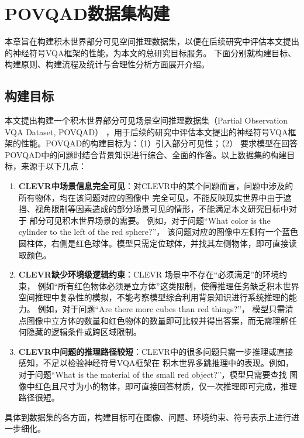 \chapter{POVQAD数据集构建}
\label{dataset}
本章旨在构建积木世界部分可见空间推理数据集，以便在后续研究中评估本文提出的神经符号VQA框架的性能，为本文的总研究目标服务。
下面分别就构建目标、构建原则、构建流程及统计与合理性分析方面展开介绍。
\section{构建目标}
本文提出构建一个积木世界部分可见场景空间推理数据集（Partial Observation VQA Data\-set, POVQAD）
，用于后续的研究中评估本文提出的神经符号VQA框架的性能。POVQAD的构建目标为：（1）引入部分可见性；（2）
要求模型在回答POVQAD中的问题时结合背景知识进行综合、全面的作答。以上数据集的构建目标，来源于以下几点：
\begin{enumerate}[nosep]
\item \textbf{CLEVR中场景信息完全可见}：对CLEVR中的某个问题而言，问题中涉及的所有物体，均在该问题对应的图像中
完全可见，不能反映现实世界中由于遮挡、视角限制等因素造成的部分场景可见的情形，不能满足本文研究目标中对于
部分可见积木世界场景的需要。
例如，对于问题“What color is the cylinder to the left of the red sphere?”，
该问题对应的图像中左侧有一个蓝色圆柱体，右侧是红色球体。模型只需定位球体，并找其左侧物体，即可直接读取颜色。
\item \textbf{CLEVR缺少环境级逻辑约束}：CLEVR 场景中不存在“必须满足”的环境约束，
例如“所有红色物体必须是立方体”这类限制，使得推理任务缺乏积木世界空间推理中复杂性的模拟，不能考察模型综合利用背景知识进行系统推理的能力。
例如，对于问题“Are there more cubes than red things?”，
模型只需清点图像中立方体的数量和红色物体的数量即可比较并得出答案，而无需理解任何隐藏的逻辑条件或跨区域限制。
\item \textbf{CLEVR中问题的推理路径较短}：CLEVR中的很多问题只需一步推理或直接感知，不足以检验神经符号VQA框架在
积木世界多跳推理中的表现。例如，对于问题“What is the material of the small red object?”，模型只需要查找
图像中红色且尺寸为小的物体，即可直接回答材质，仅一次推理即可完成，推理路径很短。
\end{enumerate}
具体到数据集的各方面，构建目标可在图像、问题、环境约束、符号表示上进行进一步细化。
